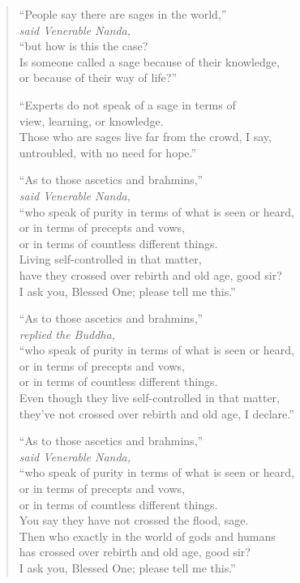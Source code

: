 \documentclass[12pt,openany]{book}%
\newcommand*{\scspeaker}[1]{\hspace{2em}\textit{#1}}
\begin{document}
\begin{verse}%
“People say there are sages in the world,” \\
\scspeaker{said Venerable Nanda, }\\
“but how is this the case? \\
Is someone called a sage because of their knowledge, \\
or because of their way of life?” 

“Experts do not speak of a sage in terms of \\
view, learning, or knowledge. \\
Those who are sages live far from the crowd, I say, \\
untroubled, with no need for hope.” 

“As to those ascetics and brahmins,” \\
\scspeaker{said Venerable Nanda, }\\
“who speak of purity in terms of what is seen or heard, \\
or in terms of precepts and vows, \\
or in terms of countless different things. \\
Living self-controlled in that matter, \\
have they crossed over rebirth and old age, good sir? \\
I ask you, Blessed One; please tell me this.” 

“As to those ascetics and brahmins,” \\
\scspeaker{replied the Buddha, }\\
“who speak of purity in terms of what is seen or heard, \\
or in terms of precepts and vows, \\
or in terms of countless different things. \\
Even though they live self-controlled in that matter, \\
they’ve not crossed over rebirth and old age, I declare.” 

“As to those ascetics and brahmins,” \\
\scspeaker{said Venerable Nanda, }\\
“who speak of purity in terms of what is seen or heard, \\
or in terms of precepts and vows, \\
or in terms of countless different things. \\
You say they have not crossed the flood, sage. \\
Then who exactly in the world of gods and humans \\
has crossed over rebirth and old age, good sir? \\
I ask you, Blessed One; please tell me this.” 


\end{verse}
\end{document}

